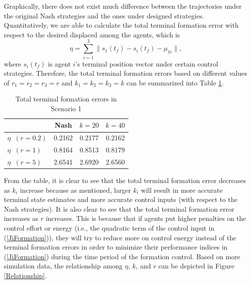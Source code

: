 \documentclass[letterpaper, 10 pt, conference,onecolumn]{ieeeconf}  %
\begin{document}
Graphically, there does not exist much difference between the trajectories under the original Nash strategies and the ones under designed strategies. Quantitatively, we are able to calculate the total terminal formation error with respect to the desired displaced among the agents, which is
\begin{equation}
\eta=\sum^3_{i=1}\|s_1(t_f)-s_i(t_f)-{\mu_{1i}}\|,
\end{equation}
where $s_i(t_f)$ is agent $i$'s terminal position vector under certain control strategies. Therefore, the total terminal formation errors based on different values of $r_1=r_2=r_3=r$ and $k_1=k_2=k_3=k$ can be summarized into Table \ref{Comparison}.
\begin{table}[h]\normalsize
\centering
\begin{tabular}{|l|c|c|c|}
  \hline
         & Nash & $k=20$ & $k=40$ \\
         \hline
         $\eta\;\;(r=0.2)$ & 0.2162 & 0.2177 & 0.2162 \\
         \hline
  $\eta\;\;(r=1)$ &  0.8164 &  0.8513 & 0.8179 \\
  \hline
  $\eta\;\;(r=5)$ &  2.6541 & 2.6920 & 2.6560 \\
  \hline
\end{tabular}
\caption{Total terminal formation errors in Scenario 1}\label{Comparison}
\end{table}
From the table, it is clear to see that the total terminal formation error decreases as $k_i$ increase because as mentioned, larger $k_i$ will result in more accurate terminal state estimates and more accurate control inputs (with respect to the Nash strategies). It is also clear to see that the total terminal formation error increases as $r$ increases. This is because that if agents put higher penalties on the control effort or energy (i.e., the quadratic term of the control input in (\ref{JiFormation})), they will try to reduce more on control energy instead of the terminal formation errors in order to minimize their performance indices in (\ref{JiFormation}) during the time period of the formation control. Based on more simulation data, the relationship among $\eta$, $k$, and $r$ can be depicted in Figure \ref{Relationship}.
\end{document}
